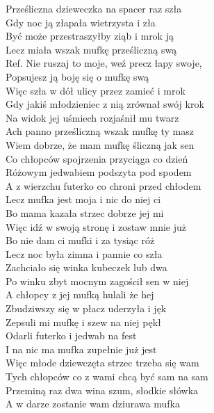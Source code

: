 
\begin{flushleft}
Prześliczna dzieweczka na spacer raz szła \\
Gdy noc ją złapała wietrzysta i zła \\
Być może przestraszyłby ziąb i mrok ją \\
Lecz miała wszak mufkę prześliczną swą \\
\vskip 3mm
Ref. Nie ruszaj to moje, weź precz łapy swoje,\\
\hspace{0.9cm}Popsujesz ją boję się o mufkę swą \\
\vskip 3mm
Więc szła w dół ulicy przez zamieć i mrok \\
Gdy jakiś młodzieniec z nią zrównał swój krok \\
Na widok jej uśmiech rozjaśnił mu twarz \\
Ach panno prześliczną wszak mufkę ty masz \\
\vskip 3mm
Wiem dobrze, że mam mufkę śliczną jak sen \\
Co chłopców spojrzenia przyciąga co dzień \\
Różowym jedwabiem podszyta pod spodem \\
A z wierzchu futerko co chroni przed chłodem \\
\vskip 3mm
Lecz mufka jest moja i nic do niej ci \\
Bo mama kazała strzec dobrze jej mi \\
Więc idź w swoją stronę i zostaw mnie już \\
Bo nie dam ci mufki i za tysiąc róż \\
\vskip 3mm
Lecz noc była zimna i pannie co szła \\
Zachciało się winka kubeczek lub dwa \\
Po winku zbyt mocnym zagościł sen w niej \\
A chłopcy z jej mufką hulali że hej \\
\vskip 3mm
Zbudziwszy się w płacz uderzyła i jęk \\
Zepsuli mi mufkę i szew na niej pękł \\
Odarli futerko i jedwab na fest \\
I na nic ma mufka zupełnie już jest \\
\vskip 3mm
Więc młode dziewczęta strzec trzeba się wam \\
Tych chłopców co z wami chcą być sam na sam \\
Przeminą raz dwa wina szum, słodkie słówka \\
A w darze zostanie wam dziurawa mufka \\
\end{flushleft}
\clearpage
